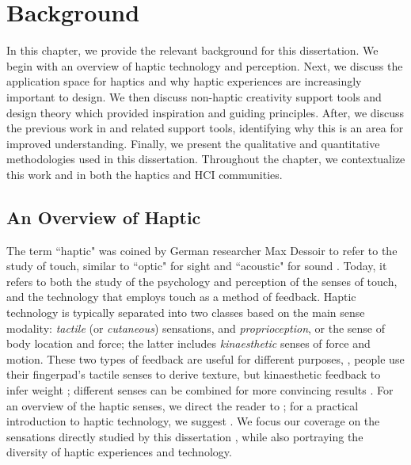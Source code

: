 
\chapter{Background}
\label{ch:rw}

In this chapter, we provide the relevant background for this dissertation.
We begin with an overview of haptic technology and perception.
Next, we discuss the application space for haptics and why haptic experiences are increasingly important to design.
We then discuss non-haptic creativity support tools and design theory which provided inspiration and guiding principles.
After, we discuss the previous work in \haxd and related support tools, identifying why this is an area for improved understanding.
Finally, we present the qualitative and quantitative methodologies used in this dissertation.
Throughout the chapter, we contextualize this work and \haxd in both the haptics and HCI communities.


%
%
\section{An Overview of Haptic}
The term ``haptic" was coined  by German researcher Max Dessoir to refer to the study of touch, similar to ``optic" for sight and ``acoustic" for sound \cite{Grunwald2008}.
Today, it refers to both the study of the psychology and perception of the senses of touch, and the technology that employs touch as a method of feedback.
Haptic technology is typically separated into two classes based on the main sense modality: \emph{tactile} (or \emph{cutaneous}) sensations, and \emph{proprioception}, or the sense of body location and force;  the latter includes \emph{kinaesthetic} senses of force and motion.
These two types of feedback are useful for different purposes, \eg, people use their fingerpad's tactile senses to derive texture, but kinaesthetic feedback to infer weight \cite{Lederman1987};
different senses can be combined for more convincing results \cite{Okamura1998}.
For an overview of the haptic senses, we direct the reader to \citet{Lederman2009survey}; for a practical introduction to haptic technology, we suggest \citet{Hayward2007}.
We focus our coverage on the sensations directly studied by this dissertation , while also portraying the diversity of haptic experiences and technology.

